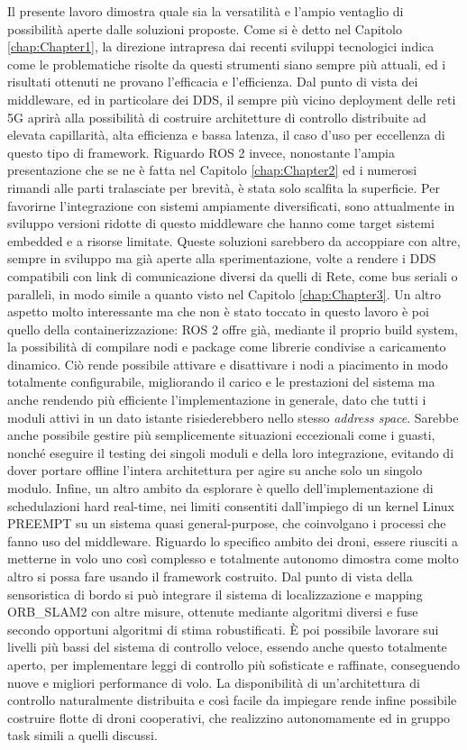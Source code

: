 \indent Il presente lavoro dimostra quale sia la versatilità e l'ampio ventaglio di possibilità aperte dalle soluzioni proposte. Come si è detto nel Capitolo \ref{chap:Chapter1}, la direzione intrapresa dai recenti sviluppi tecnologici indica come le problematiche risolte da questi strumenti siano sempre più attuali, ed i risultati ottenuti ne provano l'efficacia e l'efficienza. Dal punto di vista dei middleware, ed in particolare dei DDS, il sempre più vicino deployment delle reti 5G aprirà alla possibilità di costruire architetture di controllo distribuite ad elevata capillarità, alta efficienza e bassa latenza, il caso d'uso per eccellenza di questo tipo di framework. Riguardo ROS 2 invece, nonostante l'ampia presentazione che se ne è fatta nel Capitolo \ref{chap:Chapter2} ed i numerosi rimandi alle parti tralasciate per brevità, è stata solo scalfita la superficie. Per favorirne l'integrazione con sistemi ampiamente diversificati, sono attualmente in sviluppo versioni ridotte di questo middleware che hanno come target sistemi embedded e a risorse limitate. Queste soluzioni sarebbero da accoppiare con altre, sempre in sviluppo ma già aperte alla sperimentazione, volte a rendere i DDS compatibili con link di comunicazione diversi da quelli di Rete, come bus seriali o paralleli, in modo simile a quanto visto nel Capitolo \ref{chap:Chapter3}. Un altro aspetto molto interessante ma che non è stato toccato in questo lavoro è poi quello della containerizzazione: ROS 2 offre già, mediante il proprio build system, la possibilità di compilare nodi e package come librerie condivise a caricamento dinamico. Ciò rende possibile attivare e disattivare i nodi a piacimento in modo totalmente configurabile, migliorando il carico e le prestazioni del sistema ma anche rendendo più efficiente l'implementazione in generale, dato che tutti i moduli attivi in un dato istante risiederebbero nello stesso \emph{address space}. Sarebbe anche possibile gestire più semplicemente situazioni eccezionali come i guasti, nonché eseguire il testing dei singoli moduli e della loro integrazione, evitando di dover portare offline l'intera architettura per agire su anche solo un singolo modulo. Infine, un altro ambito da esplorare è quello dell'implementazione di schedulazioni hard real-time, nei limiti consentiti dall'impiego di un kernel Linux PREEMPT su un sistema quasi general-purpose, che coinvolgano i processi che fanno uso del middleware.
Riguardo lo specifico ambito dei droni, essere riusciti a metterne in volo uno così complesso e totalmente autonomo dimostra come molto altro si possa fare usando il framework costruito. Dal punto di vista della sensoristica di bordo si può integrare il sistema di localizzazione e mapping ORB\_SLAM2 con altre misure, ottenute mediante algoritmi diversi e fuse secondo opportuni algoritmi di stima robustificati. È poi possibile lavorare sui livelli più bassi del sistema di controllo veloce, essendo anche questo totalmente aperto, per implementare leggi di controllo più sofisticate e raffinate, conseguendo nuove e migliori performance di volo. La disponibilità di un'architettura di controllo naturalmente distribuita e così facile da impiegare rende infine possibile costruire flotte di droni cooperativi, che realizzino autonomamente ed in gruppo task simili a quelli discussi.

